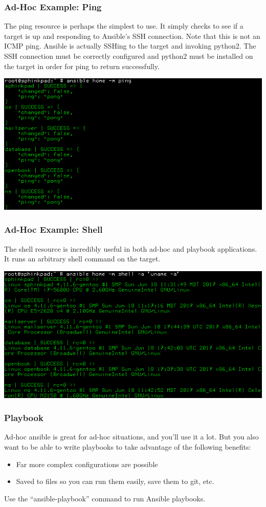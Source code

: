 \documentclass[helvetica,english,utf8,notitle,nologo]{beamer}
\begin{document}
\begin{frame}
  \frametitle{Ad-Hoc Example: Ping}

  The ping resource is perhaps the simplest to use. It simply checks
  to see if a target is up and responding to Ansible's SSH
  connection. Note that this is not an ICMP ping. Ansible is actually
  SSHing to the target and invoking python2. The SSH connection must
  be correctly configured and python2 must be installed on the target
  in order for ping to return successfully.

  \includegraphics[scale=0.44]{img_4}
\end{frame}

\begin{frame}
  \frametitle{Ad-Hoc Example: Shell}

  The shell resource is incredibly useful in both ad-hoc and playbook
  applications. It runs an arbitrary shell command on the target.

  \includegraphics[scale=0.44]{img_5}
\end{frame}

\begin{frame}
  \frametitle{Playbook}

  Ad-hoc ansible is great for ad-hoc situations, and you'll use it a
  lot. But you also want to be able to write playbooks to take
  advantage of the following benefits:

  \begin{itemize}
  \item Far more complex configurations are possible
  \item Saved to files so you can run them easily, save them to git,
    etc.
  \end{itemize}

  Use the ``ansible-playbook'' command to run Ansible playbooks.
\end{frame}
\end{document}
